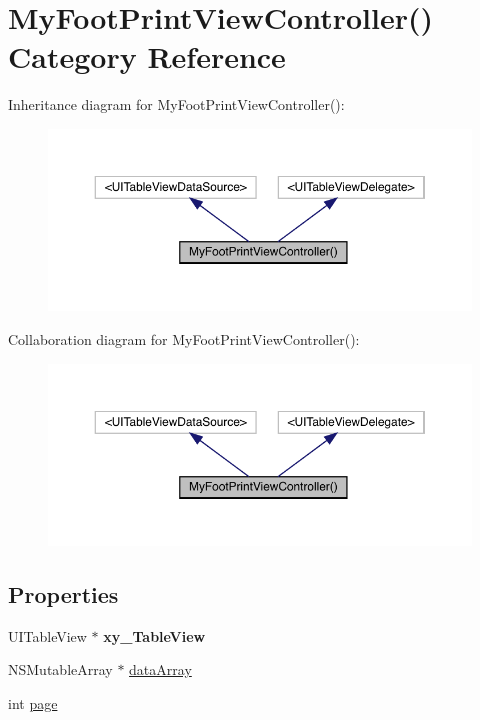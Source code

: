 \hypertarget{category_my_foot_print_view_controller_07_08}{}\section{My\+Foot\+Print\+View\+Controller() Category Reference}
\label{category_my_foot_print_view_controller_07_08}


Inheritance diagram for My\+Foot\+Print\+View\+Controller()\+:\nopagebreak
\begin{figure}[H]
\begin{center}
\leavevmode
\includegraphics[width=350pt]{category_my_foot_print_view_controller_07_08__inherit__graph}
\end{center}
\end{figure}


Collaboration diagram for My\+Foot\+Print\+View\+Controller()\+:\nopagebreak
\begin{figure}[H]
\begin{center}
\leavevmode
\includegraphics[width=350pt]{category_my_foot_print_view_controller_07_08__coll__graph}
\end{center}
\end{figure}
\subsection*{Properties}
\begin{DoxyCompactItemize}
\item 
\mbox{\label{category_my_foot_print_view_controller_07_08_a6db23f06051bd3862f4ee154640e9a18}} 
U\+I\+Table\+View $\ast$ {\bfseries xy\+\_\+\+Table\+View}
\item 
N\+S\+Mutable\+Array $\ast$ \mbox{\hyperlink{category_my_foot_print_view_controller_07_08_a50d10794a3fb6eb2e315e7d29ae57b7a}{data\+Array}}
\item 
int \mbox{\hyperlink{category_my_foot_print_view_controller_07_08_a33c20d3635235aebf7982e8ed58a3ee6}{page}}
\end{DoxyCompactItemize}


